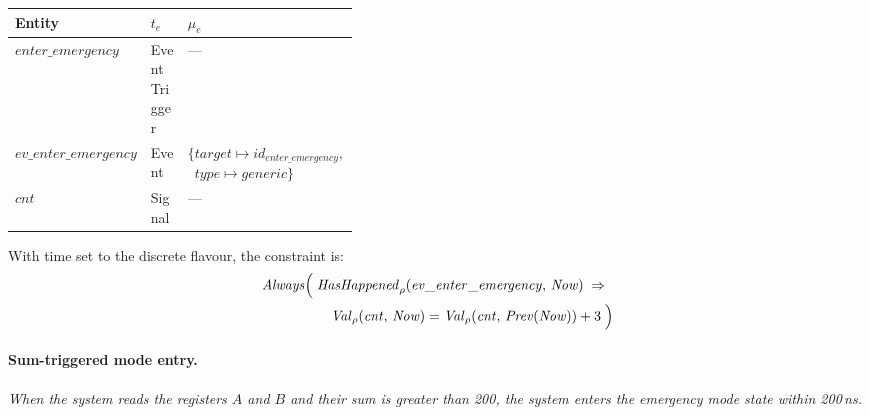{\footnotesize
    \begin{center}
        \begin{tabular}{@{}l l p{0.40\linewidth}@{}}
            \toprule
            \textbf{Entity}                 & $t_e$        & $\mu_e$ \\
            \midrule
            $\mathit{enter\_emergency}$     & EventTrigger & ---     \\
            $\mathit{ev\_enter\_emergency}$ & Event        &
            $\{\mathit{target} \mapsto id_{\mathit{enter\_emergency}},$\newline
            $\phantom{\{}\mathit{type} \mapsto \mathit{generic}\}$   \\
            $\mathit{cnt}$                  & Signal       & ---     \\
            \bottomrule
        \end{tabular}
    \end{center}
}

With time set to the discrete flavour, the constraint is:
{\footnotesize
\begin{align*}
    \mathit{Always}\Bigl(\;
     & \mathit{HasHappened}_\rho(\mathit{ev\_enter\_emergency},\, \mathit{Now}) \;\Rightarrow{} \\
     & \quad \mathit{Val}_\rho(\mathit{cnt},\, \mathit{Now}) =
    \mathit{Val}_\rho(\mathit{cnt},\, \mathit{Prev}(\mathit{Now})) + 3
    \;\Bigr)
\end{align*}
}

\paragraph{Sum-triggered mode entry.}
\textit{When the system reads the registers $A$ and $B$ and their sum is greater than 200, the system enters the emergency mode state within 200\,ns.}


